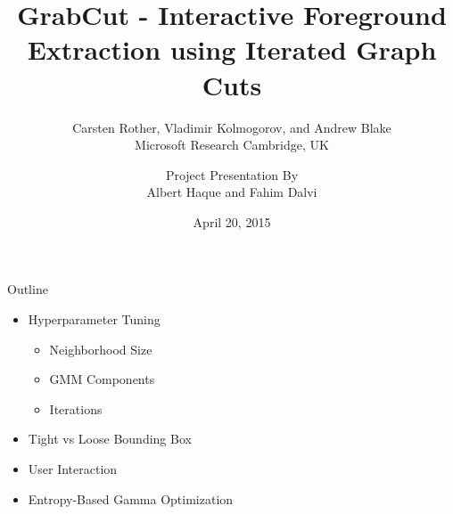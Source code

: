 \documentclass[compress,aspectratio=43]{beamer}
\title[Stanford University]{GrabCut - Interactive Foreground Extraction using Iterated Graph Cuts}
\subtitle{\scriptsize \vspace{3mm}Carsten Rother, Vladimir Kolmogorov, and Andrew Blake\\Microsoft Research Cambridge, UK\vspace{-3mm}}
\author[\enspace\,\,\, Albert Haque, Fahim Dalvi]{
{\scriptsize Project Presentation By}\\
{\small Albert Haque and Fahim Dalvi}\\
\vspace{-6mm}}
\institute[Stanford University]{}
\date{April 20, 2015}
\begin{document}
\section{}%
\begin{frame}
\titlepage
\end{frame}

\begin{frame}{Outline}
\begin{itemize}
\item Hyperparameter Tuning
\begin{itemize}
    \item{Neighborhood Size}
    \item{GMM Components}
    \item{Iterations}
\end{itemize}
\item Tight vs Loose Bounding Box
\item User Interaction
\item Entropy-Based Gamma Optimization
\end{itemize}
\end{frame}
\end{document}
